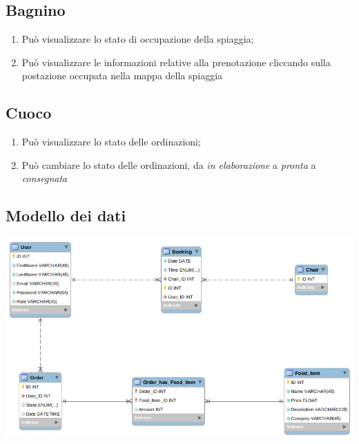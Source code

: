 \documentclass{article}
\begin{document}
\subsection{Bagnino}
\begin{enumerate}
	\item Può visualizzare lo stato di occupazione della spiaggia;
	\item Può visualizzare le informazioni relative alla prenotazione cliccando sulla postazione occupata nella mappa della spiaggia 
\end{enumerate}

\subsection{Cuoco}
\begin{enumerate}
	\item Può visualizzare lo stato delle ordinazioni;
		
	\item Può cambiare lo stato delle ordinazioni, da \textit{in elaborazione} a \textit{pronta} a \textit{consegnata}
\end{enumerate}

\subsection{Modello dei dati}
\begin{center}
	\includegraphics[scale=0.5]{dbmodel}
\end{center}


	
\end{document}
